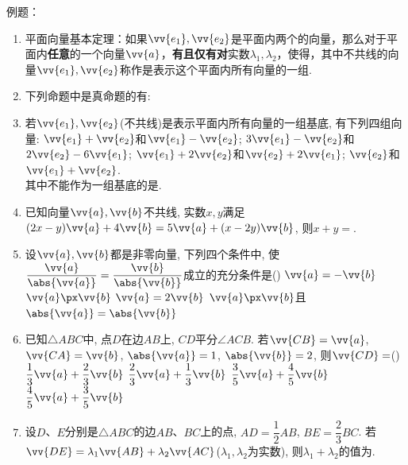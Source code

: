 例题：
\begin{enumerate}
    \item 平面向量基本定理：如果$\vv{e_1}, \vv{e_2}$是平面内两个的向量，那么对于平面内\textbf{任意}的一个向量$\vv{a}$，\textbf{有且仅有对}实数$\lambda_1, \lambda_2$，使得，其中不共线的向量$\vv{e_1}, \vv{e_2}$称作是表示这个平面内所有向量的一组.
    \item 下列命题中是真命题的有: 
    
    
    \item 若$\vv{e_1},\vv{e_2}$(不共线)是表示平面内所有向量的一组基底, 有下列四组向量: 
     $\vv{e_1}+\vv{e_2}$和$\vv{e_1}-\vv{e_2}$; 
     $3\vv{e_1}-\vv{e_2}$和$2\vv{e_2}-6\vv{e_1}$; 
     $\vv{e_1}+2\vv{e_2}$和$\vv{e_2}+2\vv{e_1}$; 
     $\vv{e_2}$和$\vv{e_1}+\vv{e_2}$. \\
    其中不能作为一组基底的是. 
    
    \item 已知向量$\vv{a},\vv{b}$不共线, 实数$x,y$满足$(2x-y)\vv{a}+4\vv{b}=5\vv{a}+(x-2y)\vv{b}$, 则$x+y=$. 

    \item 设$\vv{a},\vv{b}$都是非零向量, 下列四个条件中, 使$\dfrac{\vv{a}}{\abs{\vv{a}}}=\dfrac{\vv{b}}{\abs{\vv{b}}}$成立的充分条件是\dotfill()
    \xx
    {$\vv{a}=-\vv{b}$}
    {$\vv{a}\px\vv{b}$}
    {$\vv{a}=2\vv{b}$}
    {$\vv{a}\px\vv{b}$且$\abs{\vv{a}}=\abs{\vv{b}}$}

    \item 已知$\triangle{ABC}$中, 点$D$在边$AB$上, $CD$平分$\angle{ACB}$. 
    若$\vv{CB}=\vv{a}$,$\vv{CA}=\vv{b}$, $\abs{\vv{a}}=1$, $\abs{\vv{b}}=2$, 
    则$\vv{CD}=$\dotfill()
    \xx
    {$\dfrac{1}{3}\vv{a}+\dfrac{2}{3}\vv{b}$}
    {$\dfrac{2}{3}\vv{a}+\dfrac{1}{3}\vv{b}$}
    {$\dfrac{3}{5}\vv{a}+\dfrac{4}{5}\vv{b}$}
    {$\dfrac{4}{5}\vv{a}+\dfrac{3}{5}\vv{b}$}

    \item 设$D$、$E$分别是$\triangle{ABC}$的边$AB$、$BC$上的点, $AD=\dfrac{1}{2}AB$, $BE=\dfrac{2}{3}BC$. 若$\vv{DE}=\lambda_1\vv{AB}+\lambda_2\vv{AC}$($\lambda_1,\lambda_2$为实数), 则$\lambda_1+\lambda_2$的值为. 


\end{enumerate}
